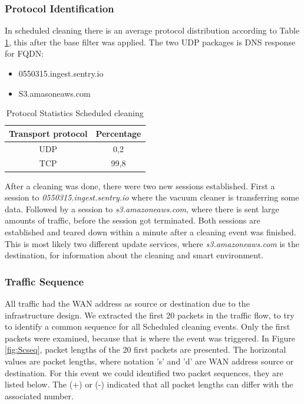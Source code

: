\subsubsection{Protocol Identification}
In scheduled cleaning there is an average protocol distribution according to Table \ref{tab:scanalysisdist}, this after the base filter was applied. The two UDP packages is DNS response for FQDN:

\begin{itemize}
    \item 0550315.ingest.sentry.io
    \item S3.amasoneaws.com
\end{itemize}

\begin{table}[H]
\centering
\caption{Protocol Statistics Scheduled cleaning}
\label{tab:scanalysisdist}
\begin{tabular}{|c|c|}
\hline
\textbf{Transport protocol} & \textbf{Percentage} \\ \hline
UDP                         & 0,2                 \\ \hline
TCP                         & 99,8                \\ \hline
\end{tabular}
\end{table}

After a cleaning was done, there were two new sessions established. First a session to \textit{0550315.ingest.sentry.io} where the vacuum cleaner is transferring some data. Followed by a session to \textit{s3.amazoneaws.com}, where there is sent large amounts of traffic, before the session got terminated. Both sessions are established and teared down within a minute after a cleaning event was finished. This is most likely two different update services, where \textit{s3.amazoneaws.com} is the destination, for information about the cleaning and smart environment.
 
\subsubsection{Traffic Sequence}
All traffic had the WAN address as source or destination due to the infrastructure design. We extracted the first 20  packets in the traffic flow, to try to identify a common sequence for all Scheduled cleaning events. Only the first packets were examined, because that is where the event was triggered. In Figure \ref{fig:Scseq}, packet lengths of the 20 first packets are presented. The horizontal values are packet lengths, where notation 's' and 'd' are WAN address source or destination.  
For this event we could identified two packet sequences, they are listed below. The (+) or (-) indicated that all packet lengths can differ with the associated number. 

